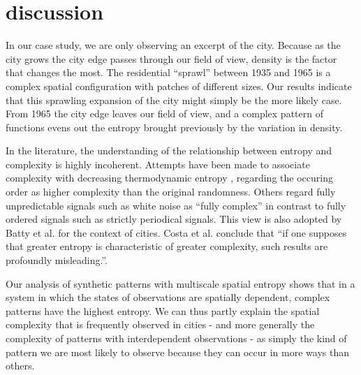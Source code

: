\documentclass[fleqn,10pt]{wlscirep}
\begin{document}
\section*{discussion}

In our case study, we are only observing an excerpt of the city. Because as the city grows the city edge passes through our field of view, density is the factor that changes the most. The residential ``sprawl'' between 1935 and 1965 is a complex spatial configuration with patches of different sizes. Our results indicate that this sprawling expansion of the city might simply be the more likely case. From 1965 the city edge leaves our field of view, and a complex pattern of functions evens out the entropy brought previously by the variation in density.

In the literature, the understanding of the relationship between entropy and complexity is highly incoherent.\cite{Shalizi2004} Attempts have been made to associate complexity with decreasing thermodynamic entropy \cite{DecreasingEntropyIsComplex1,DecreasingEntropyIsComplex2}, regarding the occuring order as higher complexity than the original randomness. Others regard fully unpredictable signals such as white noise as ``fully complex''\cite{EisComplex1} in contrast to fully ordered signals such as strictly periodical signals. This view is also adopted by Batty et al. for the context of cities.\cite{BattyMorphetKiril2012} Costa et al. conclude that ``if one supposes that greater entropy is characteristic of greater complexity, such results are profoundly misleading.''\cite{costa2000multiscale}.

Our analysis of synthetic patterns with multiscale spatial entropy shows that in a system in which the states of observations are spatially dependent, complex patterns have the highest entropy. We can thus partly explain the spatial complexity that is frequently observed in cities\cite{ScalingLaws,FractalCities,MultifractalBeijing,MultifractalZipf} - and more generally the complexity of patterns with interdependent observations -  as simply the kind of pattern we are most likely to observe because they can occur in more ways than others.
\end{document}
